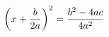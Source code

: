 \documentclass[preview]{standalone}
\begin{document}
\begin{align*}
\special{dvisvgm:raw <g id='unique000'>}\left(x+\frac{b}{2a}\right)^2=\frac{b^2-4ac}{4a^2}\special{dvisvgm:raw </g>}
\end{align*}
\end{document}
